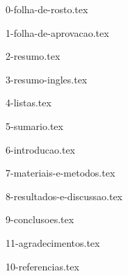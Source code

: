 \documentclass[12pt,nodisplayskipstretch]{article}
\begin{document}


{0-folha-de-rosto.tex}

{1-folha-de-aprovacao.tex}

{2-resumo.tex}

{3-resumo-ingles.tex}

{4-listas.tex}

{5-sumario.tex}


{6-introducao.tex}

{7-materiais-e-metodos.tex}

{8-resultados-e-discussao.tex}

{9-conclusoes.tex}

{11-agradecimentos.tex}

{10-referencias.tex}
\end{document}
